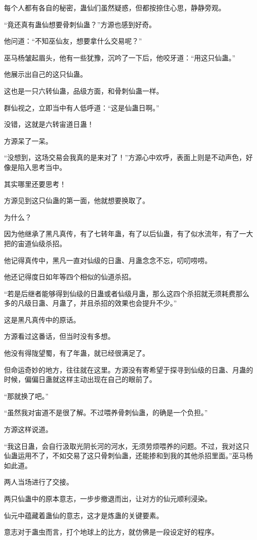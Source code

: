 \begin{this_body}
每个人都有各自的秘密，蛊仙们虽然疑惑，但都按捺住心思，静静旁观。

“竟还真有蛊仙想要骨刺仙蛊？”方源也感到好奇。

他问道：“不知巫仙友，想要拿什么交易呢？”

巫马杨皱起眉头，他有一些犹豫，沉吟了一下后，他咬牙道：“用这只仙蛊。”

他展示出自己的这只仙蛊。

这也是一只六转仙蛊，品级方面，和骨刺仙蛊一样。

群仙视之，立即当中有人低呼道：“这是仙蛊日啊。”

没错，这就是六转宙道日蛊！

方源呆了一呆。

“没想到，这场交易会我真的是来对了！”方源心中欢呼，表面上则是不动声色，好像是陷入思考当中。

其实哪里还要思考！

方源见到这只仙蛊的第一面，他就想要换取了。

为什么？

因为他继承了黑凡真传，有了七转年蛊，有了以后仙蛊，有了似水流年，有了一大把的宙道仙级杀招。

他记得真传中，黑凡一直对仙级的日蛊、月蛊念念不忘，叨叨唠唠。

他还记得度日如年等四个相似的仙道杀招。

“若是后继者能够得到仙级的日蛊或者仙级月蛊，那么这四个杀招就无须耗费那么多的凡级日蛊、月蛊了，并且杀招的效果也会提升不少。”

这是黑凡真传中的原话。

方源看过这番话，但当时没有多想。

他没有得陇望蜀，有了年蛊，就已经很满足了。

但命运奇妙的地方，往往就在这里。方源没有寄希望于探寻到仙级的日蛊、月蛊的时候，偏偏日蛊就这样主动出现在自己的眼前了。

“那就换了吧。”

“虽然我对宙道不是很了解。不过喂养骨刺仙蛊，的确是一个负担。”

方源这样说道。

“我这日蛊，会自行汲取光阴长河的河水，无须劳烦喂养的问题。不过，我对这只仙蛊运用不了，不如交易了这只骨刺仙蛊，还能掺和到我的其他杀招里面。”巫马杨如此道。

两人当场进行了交接。

两只仙蛊中的原本意志，一步步撤退而出，让对方的仙元顺利浸染。

仙元中蕴藏着蛊仙的意志，这才是炼蛊的关键要素。

意志对于蛊虫而言，打个地球上的比方，就仿佛是一段设定好的程序。


\end{this_body}
